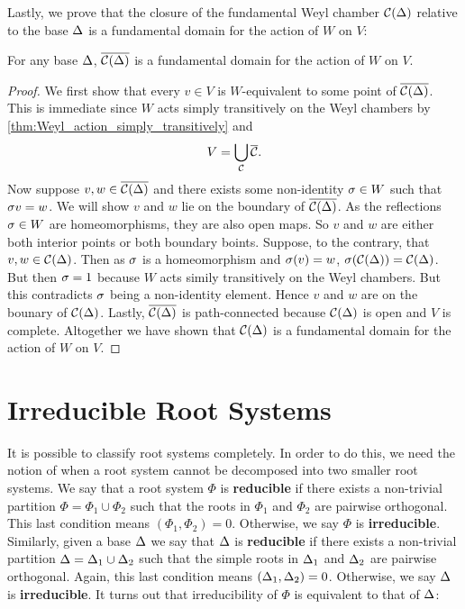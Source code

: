 \documentclass[12pt,reqno,oneside]{amsart}
\begin{document}
    Lastly, we prove that the closure of the fundamental Weyl chamber $\mathcal{C}(\Delta)$ relative to the base $\Delta$ is a fundamental domain for the action of $W$ on $V$:

    \begin{proposition}\label{prop:fundamental_domain}
        For any base $\Delta$, $\overline{\mathcal{C}(\Delta)}$ is a fundamental domain for the action of $W$ on $V$.
    \end{proposition}
    \begin{proof}
        We first show that every $v \in V$ is $W$-equivalent to some point of $\overline{\mathcal{C}(\Delta)}$. This is immediate since $W$ acts simply transitively on the Weyl chambers by \cref{thm:Weyl_action_simply_transitively} and
        \[
            V = \bigcup_{\mathcal{C}}\overline{\mathcal{C}}.
        \]
        Now suppose $v,w \in \overline{\mathcal{C}(\Delta)}$ and there exists some non-identity $\sigma \in W$ such that $\sigma v = w$. We will show $v$ and $w$ lie on the boundary of $\overline{\mathcal{C}(\Delta)}$. As the reflections $\sigma \in W$ are homeomorphisms, they are also open maps. So $v$ and $w$ are either both interior points or both boundary boints. Suppose, to the contrary, that $v,w \in \mathcal{C}(\Delta)$. Then as $\sigma$ is a homeomorphism and $\sigma(v) = w$, $\sigma(\mathcal{C}(\Delta)) = \mathcal{C}(\Delta)$. But then $\sigma = 1$ because $W$ acts simily transitively on the Weyl chambers. But this contradicts $\sigma$ being a non-identity element. Hence $v$ and $w$ are on the bounary of $\mathcal{C}(\Delta)$. Lastly, $\overline{\mathcal{C}(\Delta)}$ is path-connected because $\mathcal{C}(\Delta)$ is open and $V$ is complete. Altogether we have shown that $\mathcal{C}(\Delta)$ is a fundamental domain for the action of $W$ on $V$.
    \end{proof}
\section{Irreducible Root Systems}
    It is possible to classify root systems completely. In order to do this, we need the notion of when a root system cannot be decomposed into two smaller root systems. We say that a root system $\Phi$ is \textbf{reducible} if there exists a non-trivial partition $\Phi = \Phi_{1} \cup \Phi_{2}$ such that the roots in $\Phi_{1}$ and $\Phi_{2}$ are pairwise orthogonal. This last condition means $(\Phi_{1},\Phi_{2}) = 0$. Otherwise, we say $\Phi$ is \textbf{irreducible}. Similarly, given a base $\Delta$ we say that $\Delta$ is \textbf{reducible} if there exists a non-trivial partition $\Delta = \Delta_{1} \cup \Delta_{2}$ such that the simple roots in $\Delta_{1}$ and $\Delta_{2}$ are pairwise orthogonal. Again, this last condition means $(\Delta_{1},\Delta_{2}) = 0$. Otherwise, we say $\Delta$ is \textbf{irreducible}. It turns out that irreducibility of $\Phi$ is equivalent to that of $\Delta$:
    
\end{document}
